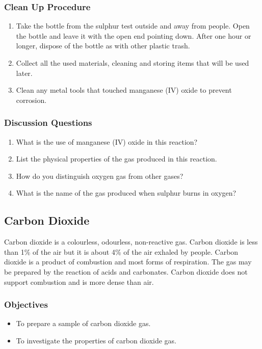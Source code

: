\subsubsection*{Clean Up Procedure}
\begin{enumerate}
\item{Take the bottle from the sulphur test outside and away from people. Open the bottle and leave it with the open end pointing down. After one hour or longer, dispose of the bottle as with other plastic trash.}
\item{Collect all the used materials, cleaning and storing items that will be used later.}
\item{Clean any metal tools that touched manganese (IV) oxide to prevent corrosion.}
\end{enumerate}

\subsubsection*{Discussion Questions}
\begin{enumerate}
\item{What is the use of manganese (IV) oxide in this reaction?}
\item{List the physical properties of the gas produced in this reaction.}
\item{How do you distinguish oxygen gas from other gases?}
\item{What is the name of the gas produced when sulphur burns in oxygen?}
\end{enumerate}

\subsection{Carbon Dioxide}

Carbon dioxide is a colourless, odourless, non-reactive gas. Carbon dioxide is less than 1\% of the air but it is about 4\% of the air exhaled by people. Carbon dioxide is a product of combustion and most forms of respiration. The gas may be prepared by the reaction of acids and carbonates. Carbon dioxide does not support combustion and is more dense than air.

\subsubsection*{Objectives}
\begin{itemize}
\item{To prepare a sample of carbon dioxide gas.}
\item{To investigate the properties of carbon dioxide gas.}
\end{itemize}

